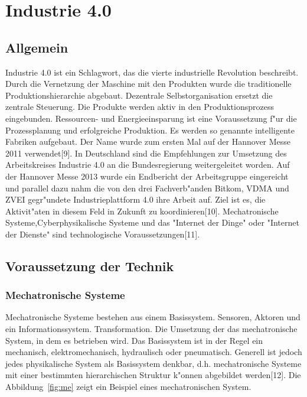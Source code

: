 \section{Industrie 4.0}
%
\subsection{Allgemein}

Industrie 4.0 ist ein Schlagwort, das die vierte industrielle 
Revolution beschreibt. Durch die Vernetzung der Maschine mit 
den Produkten wurde die traditionelle Produktionshierarchie abgebaut. 
Dezentrale Selbstorganisation ersetzt die zentrale Steuerung. 
Die Produkte werden aktiv in den Produktionsprozess eingebunden. 
Ressourcen- und Energieeinsparung ist eine Voraussetzung 
f"ur die Prozessplanung und erfolgreiche Produktion.
 Es werden so genannte intelligente Fabriken aufgebaut.
Der Name wurde zum ersten Mal auf der Hannover Messe 2011 verwendet[9]. 
In Deutschland sind die Empfehlungen zur Umsetzung des Arbeitskreises 
Industrie 4.0 an die Bundesregierung weitergeleitet worden.
 Auf der Hannover Messe 2013 wurde ein Endbericht der Arbeitsgruppe
  eingereicht und parallel dazu nahm die von den drei Fachverb"anden 
  Bitkom, VDMA und ZVEI gegr"undete Industrieplattform 4.0 
  ihre Arbeit auf. Ziel ist es, die Aktivit"aten 
  in diesem Feld in Zukunft zu koordinieren[10].
Mechatronische Systeme,Cyberphysikalische Systeme und das "Internet der 
Dinge" oder "Internet der Dienste" sind technologische 
Voraussetzungen[11]. 





\subsection{Voraussetzung der Technik}
%
\subsubsection{Mechatronische Systeme}
Mechatronische Systeme bestehen aus einem Basissystem.
Sensoren, Aktoren und ein Informationssystem.
Transformation. Die Umsetzung der
das mechatronische System, in dem es betrieben wird.
Das Basissystem ist in der Regel ein
mechanisch, elektromechanisch, hydraulisch oder pneumatisch.
Generell ist jedoch jedes physikalische System als Basissystem denkbar, 
d.h. mechatronische Systeme mit einer bestimmten 
hierarchischen Struktur k"onnen abgebildet werden[12].
Die Abbildung~\ref{fig:me} zeigt ein Beispiel eines 
mechatronischen System.

